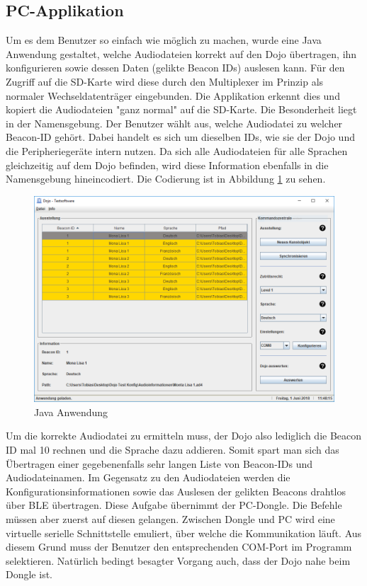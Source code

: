 \subsection{PC-Applikation}
Um es dem Benutzer so einfach wie möglich zu machen, wurde eine Java Anwendung gestaltet, welche Audiodateien korrekt auf den Dojo übertragen, ihn konfigurieren sowie dessen Daten (gelikte Beacon IDs) auslesen kann.
Für den Zugriff auf die SD-Karte wird diese durch den Multiplexer im Prinzip als normaler Wechseldatenträger eingebunden. Die Applikation erkennt dies und kopiert die Audiodateien "ganz normal" auf die SD-Karte. Die Besonderheit liegt in der Namensgebung. Der Benutzer wählt aus, welche Audiodatei zu welcher Beacon-ID gehört. Dabei handelt es sich um dieselben IDs, wie sie der Dojo und die Peripheriegeräte intern nutzen. Da sich alle Audiodateien für alle Sprachen gleichzeitig auf dem Dojo befinden, wird diese Information ebenfalls in die Namensgebung hineincodiert. Die Codierung ist in Abbildung \ref{fig:soft_5} zu sehen.
\begin{figure}[h]
	\centering
	\includegraphics[width=\textwidth]{graphics/Java_Anwendung.png}
	\caption{Java Anwendung}
	\label{fig:soft_5}
\end{figure}
Um die korrekte Audiodatei zu ermitteln muss, der Dojo also lediglich die Beacon ID mal 10 rechnen und die Sprache dazu addieren. Somit spart man sich das Übertragen einer gegebenenfalls sehr langen Liste von Beacon-IDs und Audiodateinamen.
Im Gegensatz zu den Audiodateien werden die Konfigurationsinformationen sowie das Auslesen der gelikten Beacons drahtlos über BLE übertragen. Diese Aufgabe übernimmt der PC-Dongle. Die Befehle müssen aber zuerst auf diesen gelangen. Zwischen Dongle und PC wird eine virtuelle serielle Schnittstelle emuliert, über welche die Kommunikation läuft. Aus diesem Grund muss der Benutzer den entsprechenden COM-Port im Programm selektieren. Natürlich bedingt besagter Vorgang auch, dass der Dojo nahe beim Dongle ist. \newpage
